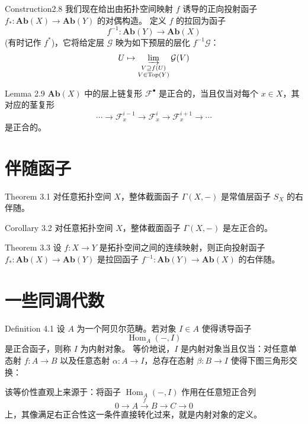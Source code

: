 \documentclass{beamer}
\begin{document}
\begin{frame}
\begin{block}{Construction2.8}
我们现在给出由拓扑空间映射 $f$ 诱导的正向投射函子
$f_{*}: \mathbf{Ab}(X) \to \mathbf{Ab}(Y)$ 的对偶构造。
定义 $f$ 的拉回为函子
$$f^{-1}: \mathbf{Ab}(Y) \to \mathbf{Ab}(X)$$
(有时记作 $f^{*}$)，它将给定层 $\mathcal{G}$ 映为如下预层的层化 $f^{-1}\mathcal{G}$：
$$U \mapsto \varinjlim_{\substack{V \supseteq f(U) \\ V \in \operatorname{Top}(Y)}} \mathcal{G}(V)$$


\end{block}

\end{frame}
\begin{frame}
\begin{block}{Lemma 2.9}
$\mathbf{Ab}(X)$ 中的层上链复形 $\mathcal{F}^\bullet$ 是正合的，当且仅当对每个 $x\in X$，其对应的茎复形
\[
\cdots \to \mathcal{F}_x^{i-1} \to \mathcal{F}_x^i \to \mathcal{F}_x^{i+1} \to \cdots
\]
是正合的。
\end{block}

\end{frame}
\section{伴随函子}

\begin{frame}
\begin{block}{Theorem 3.1}
对任意拓扑空间 $X$，整体截面函子 $\Gamma(X,-)$ 是常值层函子 $S_{X}$ 的右伴随。
\end{block}
\begin{block}{Corollary 3.2}
对任意拓扑空间 $X$，整体截面函子 $\Gamma(X,-)$ 是左正合的。
\end{block}
\end{frame}

\begin{frame}
\begin{block}{Theorem 3.3}
设 $f: X \to Y$ 是拓扑空间之间的连续映射，则正向投射函子
$f_{*}: \mathbf{Ab}(X) \to \mathbf{Ab}(Y)$ 是拉回函子
$f^{-1}: \mathbf{Ab}(Y) \to \mathbf{Ab}(X)$ 的右伴随。
\end{block}
\end{frame}

\section{一些同调代数}

\begin{frame}
\begin{block}{Definition 4.1}
设 $A$ 为一个阿贝尔范畴。若对象 $I\in A$ 使得诱导函子
\[
\operatorname{Hom}_A(-,I)
\]
是正合函子，则称 $I$ 为内射对象。
等价地说，$I$ 是内射对象当且仅当：对任意单态射 $f:A\to B$ 以及任意态射 $\alpha:A\to I$，总存在态射 $\beta:B\to I$ 使得下图三角形交换：
\end{block}
该等价性直观上来源于：将函子 $\operatorname{Hom}_A(-,I)$ 作用在任意短正合列
\[0 \to A \stackrel{f}{\to} B \to C \to 0\]
上，其像满足右正合性这一条件直接转化过来，就是内射对象的定义。
\end{frame}
\end{document}
